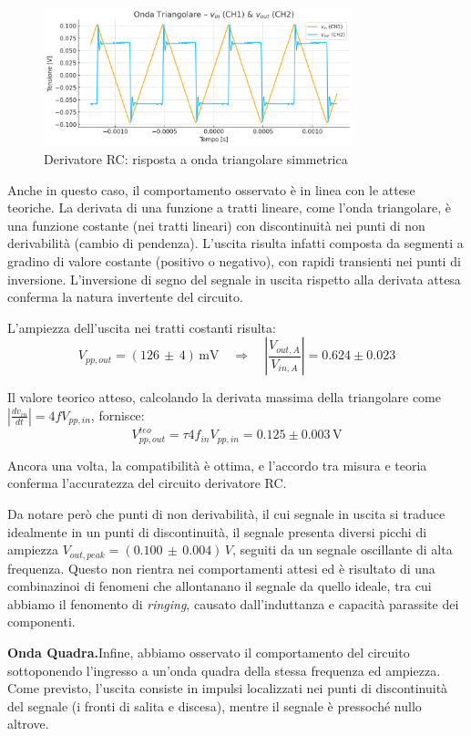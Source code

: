 \documentclass[a4paper,12pt]{article}
\begin{document}
\begin{figure}[H]
  \centering
  \includegraphics[width=0.8\textwidth]{Triangolare.png}
  \caption{Derivatore RC: risposta a onda triangolare simmetrica}
  \label{fig:derivatore_triang}
\end{figure}

Anche in questo caso, il comportamento osservato è in linea con le attese teoriche. La derivata di una funzione a tratti lineare, come l’onda triangolare, è una funzione costante (nei tratti lineari) con discontinuità nei punti di non derivabilità (cambio di pendenza). L’uscita risulta infatti composta da segmenti a gradino di valore costante (positivo o negativo), con rapidi transienti nei punti di inversione. L’inversione di segno del segnale in uscita rispetto alla derivata attesa conferma la natura invertente del circuito.

L’ampiezza dell’uscita nei tratti costanti risulta:
\[
V_{pp,out} = (126\,\pm\,4)\,\mathrm{mV}
\quad\Rightarrow\quad
\left|\frac{V_{out,A}}{V_{in,A}}\right| = 0.624 \pm 0.023
\]

Il valore teorico atteso, calcolando la derivata massima della triangolare come \(\left| \frac{dv_{in}}{dt} \right| = 4f V_{pp, in}\), fornisce:
\[
V_{pp,out}^{teo} = \tau 4f_{in} V_{pp, in} = 0.125 \pm 0.003\,\mathrm{V}
\]

Ancora una volta, la compatibilità è ottima, e l’accordo tra misura e teoria conferma l’accuratezza del circuito derivatore RC.

Da notare però che punti di non derivabilità, il cui segnale in uscita si traduce idealmente in un punti di discontinuità, il segnale presenta diversi picchi di ampiezza \(V_{out, peak} = (0.100\, \pm\, 0.004)\, V\), seguiti da un segnale oscillante di alta frequenza. Questo non rientra nei comportamenti attesi ed è risultato di una combinazinoi di fenomeni che allontanano il segnale da quello ideale, tra cui abbiamo il fenomento di \textit{ringing}, causato dall'induttanza e capacità parassite dei componenti. 

\vspace{0.3cm}
\textbf{Onda Quadra.}Infine, abbiamo osservato il comportamento del circuito sottoponendo l’ingresso a un’onda quadra della stessa frequenza ed ampiezza. Come previsto, l’uscita consiste in impulsi localizzati nei punti di discontinuità del segnale (i fronti di salita e discesa), mentre il segnale è pressoché nullo altrove.
\end{document}
